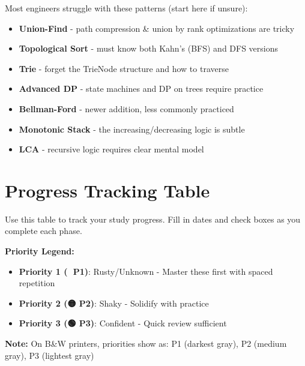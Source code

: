 \documentclass[10pt]{article}
\begin{document}
Most engineers struggle with these patterns (start here if unsure):
\begin{itemize}
\item \textbf{Union-Find} - path compression \& union by rank optimizations are tricky
\item \textbf{Topological Sort} - must know both Kahn's (BFS) and DFS versions
\item \textbf{Trie} - forget the TrieNode structure and how to traverse
\item \textbf{Advanced DP} - state machines and DP on trees require practice
\item \textbf{Bellman-Ford} - newer addition, less commonly practiced
\item \textbf{Monotonic Stack} - the increasing/decreasing logic is subtle
\item \textbf{LCA} - recursive logic requires clear mental model
\end{itemize}

\newpage

\section{Progress Tracking Table}

Use this table to track your study progress. Fill in dates and check boxes as you complete each phase.

\textbf{Priority Legend:}
\begin{itemize}
\item \colorbox{priority1}{\textbf{Priority 1 (🔴 P1)}}: Rusty/Unknown - Master these first with spaced repetition
\item \colorbox{priority2}{\textbf{Priority 2 (🟡 P2)}}: Shaky - Solidify with practice
\item \colorbox{priority3}{\textbf{Priority 3 (🟢 P3)}}: Confident - Quick review sufficient
\end{itemize}

\textbf{Note:} On B\&W printers, priorities show as: P1 (darkest gray), P2 (medium gray), P3 (lightest gray)
\end{document}
